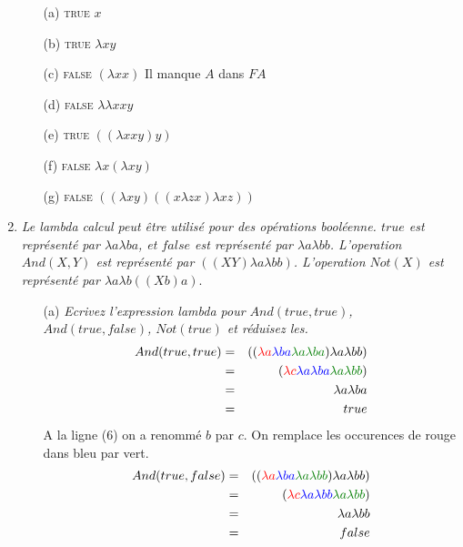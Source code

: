 \documentclass[a4paper,11pt,onecolumn]{article}
\begin{document}
\begin{enumerate}
\begin{itemize}
	\item[(a)] \textsc{true} $x$
	\item[(b)] \textsc{true} $\lambda xy$
	\item[(c)] \textsc{false} $(\lambda xx)$ Il manque $A$ dans $F A$
	\item[(d)] \textsc{false} $\lambda \lambda xxy$
	\item[(e)] \textsc{true} $((\lambda xxy)y)$
	\item[(f)] \textsc{false} $\lambda x(\lambda xy)$
	\item[(g)] \textsc{false} $((\lambda xy)((x \lambda zx) \lambda xz))$
\end{itemize}

\item \textit{Le lambda calcul peut être utilisé pour des opérations booléenne. $true$ est représenté par $\lambda a \lambda ba$, et $false$ est représenté par $\lambda a \lambda bb$. L'operation $And(X,Y)$ est représenté par $((XY)\lambda a \lambda bb)$. L'operation $Not(X)$ est représenté par $\lambda a \lambda b ((Xb)a)$}.
\begin{itemize}
	\item[(a)] \textit{Ecrivez l'expression lambda pour $And(true, true)$, $And(true, false)$, $Not(true)$ et réduisez les.}
	\begin{eqnarray}
		And(true, true) &=& ((\color{red}\lambda a \color{blue}\lambda ba \color{green}\lambda a \lambda ba \color{black}) \lambda a \lambda bb)\\
		&=& (\color{red}\lambda c \color{blue}\lambda a \lambda ba \color{green}\lambda a \lambda bb\color{black})\\
		&=& \lambda a \lambda ba \\
		&=& true
	\end{eqnarray}
	A la ligne (6) on a renommé $b$ par $c$. On remplace les occurences de \color{red}rouge \color{black} dans \color{blue}bleu \color{black} par \color{green}vert\color{black}.
	\begin{eqnarray}
		And(true, false) &=&  ((\color{red}\lambda a \color{blue}\lambda ba \color{green}\lambda a \lambda bb \color{black}) \lambda a \lambda bb)\\
		&=& (\color{red}\lambda c \color{blue}\lambda a \lambda bb \color{green}\lambda a \lambda bb\color{black})\\
		&=& \lambda a \lambda bb \\
		&=& false
	\end{eqnarray}

\end{itemize}
\end{enumerate}
\end{document}
